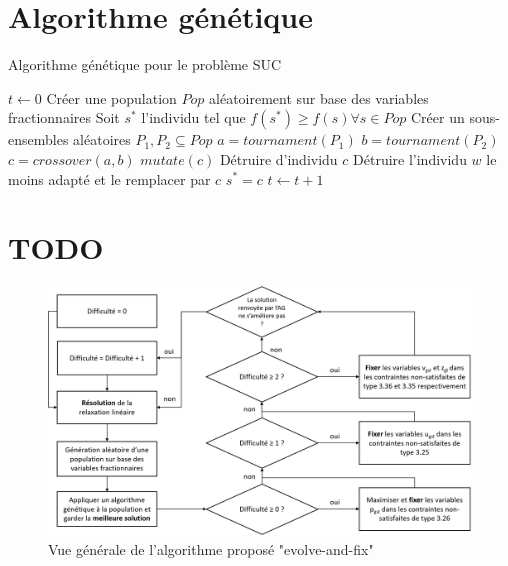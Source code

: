 \vspace*{1.2cm}

\section{Algorithme génétique}


\begin{algorithm}[H]
\caption{Algorithme génétique pour le problème SUC}
\begin{algorithmic}[1]
\State $t \leftarrow 0$
\State Créer une population $Pop$ aléatoirement sur base des variables fractionnaires
\State Soit $s^{*}$ l'individu tel que $f(s^{*}) \ge f(s) \forall s \in Pop$
\State Créer un sous-ensembles aléatoires $P_1, P_2 \subseteq Pop$
\State $a = tournament(P_1)$
\State $b = tournament(P_2)$
\State $c = crossover(a, b)$
\State $mutate(c)$
\State Détruire d'individu $c$
\Else
\State Détruire l'individu $w$ le moins adapté et le remplacer par $c$
\EndIf
{}
\State $s^{*} = c$
\EndIf
\State $t \leftarrow t + 1$
\EndWhile
\EndProcedure
\end{algorithmic}
\end{algorithm}

\section{TODO}

\begin{figure}[h!]
    \begin{center}
        \includegraphics[width=\textwidth]{imgs/evolveandfix.png}\\
        Vue générale de l'algorithme proposé "evolve-and-fix"
    \end{center}
\end{figure}